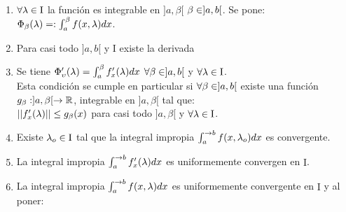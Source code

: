\begin{enumerate}[1)]
\item $\forall \lambda \in \mathrm{I}$ la función \x \flecha \fxla \phantom{} es integrable en $]a,\beta[$ \todo $\beta\in ]a,b[$. Se pone: $\Phi_\beta (\lambda)=: \int_a^\beta f(x,\lambda) dx$.
\item Para casi todo \x \en$]a,b[$ y \todo \lam \en $\mathrm{I}$ existe la derivada
\item Se tiene $\Phi_\upsilon' (\lambda)=\int_a^\beta f_x'(\lambda)dx$ $\forall \beta \in ]a,b[$ y $\forall \lambda \in \mathrm{I}$.\\
Esta condición se cumple en particular si $\forall \beta \in ]a,b[$ existe una función $g_\beta:]a,\beta[ \rightarrow \mathbb{R}$, integrable en $]a,\beta[$ tal que:\\
$|| f_x'(\lambda)|| \leq g_\beta (x)$ para casi todo \x \en $]a,\beta [$ y $\forall \lambda \in \mathrm{I}$.
\item Existe $\lambda_o \in \mathrm{I}$ tal que la integral impropia $\int_a^{\to b}f(x,
\lambda_o)dx$ es convergente. 
\item La integral impropia $\int_a^{\to b}f_x' (\lambda)dx$ es uniformemente convergen en $\mathrm{I}$.
\item La integral impropia $\int_a^{\to b}f(x,\lambda) dx$ es uniformemente convergente en $\mathrm{I}$ y al poner:\\
\end{enumerate}

